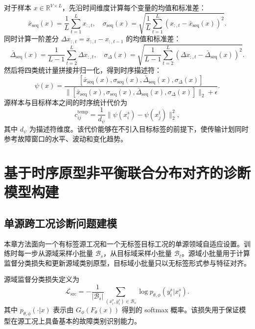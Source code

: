 \documentclass{seuthesis-2022}
\begin{document}
对于样本 $x\in\mathbb{R}^{V\times L}$，先沿时间维度计算每个变量的均值和标准差：
\begin{equation}
    \bar{x}_{\mathrm{seq}}(x)=\frac{1}{L}\sum_{t=1}^{L}x_{:,t},\quad
    \sigma_{\mathrm{seq}}(x)=\sqrt{\frac{1}{L}\sum_{t=1}^{L}(x_{:,t}-\bar{x}_{\mathrm{seq}}(x))^2}.
\end{equation}
同时计算一阶差分 $\Delta x_{:,t}=x_{:,t}-x_{:,t-1}$ 的均值和标准差：
\begin{equation}
    \bar{\Delta}_{\mathrm{seq}}(x)=\frac{1}{L-1}\sum_{t=2}^{L}\Delta x_{:,t},\quad
    \sigma_{\Delta}(x)=\sqrt{\frac{1}{L-1}\sum_{t=2}^{L}(\Delta x_{:,t}-\bar{\Delta}_{\mathrm{seq}}(x))^2}.
\end{equation}
然后将四类统计量拼接并归一化，得到时序描述符：
\begin{equation}
    \psi(x)
    =
    \frac{
    [\bar{x}_{\mathrm{seq}}(x),\sigma_{\mathrm{seq}}(x),\bar{\Delta}_{\mathrm{seq}}(x),\sigma_{\Delta}(x)]
    }{
    \|[\bar{x}_{\mathrm{seq}}(x),\sigma_{\mathrm{seq}}(x),\bar{\Delta}_{\mathrm{seq}}(x),\sigma_{\Delta}(x)]\|_2+\epsilon
    }.
\end{equation}
源样本与目标样本之间的时序统计代价为
\begin{equation}
    c_{ij}^{\mathrm{temp}}
    =
    \frac{1}{d_\psi}
    \|\psi(x_i^s)-\psi(x_j^t)\|_2^2,
\end{equation}
其中 $d_\psi$ 为描述符维度。该代价能够在不引入目标标签的前提下，使传输计划同时参考故障窗口的水平、波动和变化趋势。

\section{基于时序原型非平衡联合分布对齐的诊断模型构建}
\subsection{单源跨工况诊断问题建模}

本章方法面向一个有标签源工况和一个无标签目标工况的单源领域自适应设置。训练时每一步从源域采样小批量 $\mathcal{B}_s$，从目标域采样小批量 $\mathcal{B}_t$。源域小批量用于计算监督分类损失和更新源域类别原型，目标域小批量只以无标签形式参与特征对齐。

源域监督分类损失定义为
\begin{equation}
    \mathcal{L}_{\mathrm{src}}
    =
    -\frac{1}{|\mathcal{B}_s|}
    \sum_{(x_i^s,y_i^s)\in\mathcal{B}_s}
    \log p_{\theta,\phi}(y_i^s|x_i^s).
\end{equation}
其中 $p_{\theta,\phi}(\cdot|x)$ 表示由 $G_\phi(F_\theta(x))$ 得到的 softmax 概率。该损失用于保证模型在源工况上具备基本的故障类别识别能力。
\end{document}
